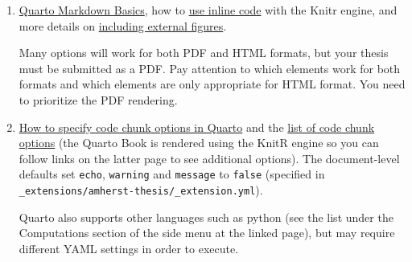 \documentclass[
  11pt,
  letterpaper,
  twoside]{report}
\begin{document}
\begin{enumerate}
\def\labelenumi{\arabic{enumi}.}
\item
  \href{https://quarto.org/docs/authoring/markdown-basics.html}{Quarto
  Markdown Basics}, how to
  \href{https://quarto.org/docs/computations/inline-code.html}{use
  inline code} with the Knitr engine, and more details on
  \href{https://quarto.org/docs/authoring/figures.html}{including
  external figures}.

  \begin{tcolorbox}[enhanced jigsaw, coltitle=black, leftrule=.75mm, rightrule=.15mm, breakable, titlerule=0mm, bottomrule=.15mm, left=2mm, colbacktitle=quarto-callout-note-color!10!white, arc=.35mm, toprule=.15mm, title=\textcolor{quarto-callout-note-color}{\faInfo}\hspace{0.5em}{Note}, toptitle=1mm, colback=white, bottomtitle=1mm, opacitybacktitle=0.6, opacityback=0, colframe=quarto-callout-note-color-frame]

  Many options will work for both PDF and HTML formats, but your thesis
  must be submitted as a PDF. Pay attention to which elements work for
  both formats and which elements are only appropriate for HTML format.
  You need to prioritize the PDF rendering.

  \end{tcolorbox}
\item
  \href{https://quarto.org/docs/computations/r.html\#chunk-options}{How
  to specify code chunk options in Quarto} and the
  \href{https://quarto.org/docs/computations/execution-options.html}{list
  of code chunk options} (the Quarto Book is rendered using the KnitR
  engine so you can follow links on the latter page to see additional
  options). The document-level defaults set \texttt{echo},
  \texttt{warning} and \texttt{message} to \texttt{false} (specified in
  \texttt{\_extensions/amherst-thesis/\_extension.yml}).

  \begin{tcolorbox}[enhanced jigsaw, coltitle=black, leftrule=.75mm, rightrule=.15mm, breakable, titlerule=0mm, bottomrule=.15mm, left=2mm, colbacktitle=quarto-callout-note-color!10!white, arc=.35mm, toprule=.15mm, title=\textcolor{quarto-callout-note-color}{\faInfo}\hspace{0.5em}{Note}, toptitle=1mm, colback=white, bottomtitle=1mm, opacitybacktitle=0.6, opacityback=0, colframe=quarto-callout-note-color-frame]

  Quarto also supports other languages such as python (see the list
  under the Computations section of the side menu at the linked page),
  but may require different YAML settings in order to execute.


\end{tcolorbox}
\end{enumerate}
\end{document}

